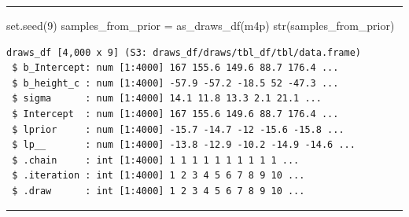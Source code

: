 \documentclass[
  letterpaper,
  DIV=11,
  numbers=noendperiod]{scrartcl}
\newenvironment{Shaded}{\begin{snugshade}}{\end{snugshade}}
\newcommand{\AttributeTok}[1]{\textcolor[rgb]{0.40,0.45,0.13}{#1}}
\newcommand{\DecValTok}[1]{\textcolor[rgb]{0.68,0.00,0.00}{#1}}
\newcommand{\FunctionTok}[1]{\textcolor[rgb]{0.28,0.35,0.67}{#1}}
\newcommand{\NormalTok}[1]{\textcolor[rgb]{0.00,0.23,0.31}{#1}}
\newcommand{\OtherTok}[1]{\textcolor[rgb]{0.00,0.23,0.31}{#1}}
\newcommand{\SpecialCharTok}[1]{\textcolor[rgb]{0.37,0.37,0.37}{#1}}
\newcommand{\StringTok}[1]{\textcolor[rgb]{0.13,0.47,0.30}{#1}}
\begin{document}
\begin{center}\rule{0.5\linewidth}{0.5pt}\end{center}

\begin{Shaded}
\begin{Highlighting}[]
\FunctionTok{set.seed}\NormalTok{(}\DecValTok{9}\NormalTok{)}
\NormalTok{samples\_from\_prior }\OtherTok{=} \FunctionTok{as\_draws\_df}\NormalTok{(m4p)}
\FunctionTok{str}\NormalTok{(samples\_from\_prior)}
\end{Highlighting}
\end{Shaded}

\begin{verbatim}
draws_df [4,000 x 9] (S3: draws_df/draws/tbl_df/tbl/data.frame)
 $ b_Intercept: num [1:4000] 167 155.6 149.6 88.7 176.4 ...
 $ b_height_c : num [1:4000] -57.9 -57.2 -18.5 52 -47.3 ...
 $ sigma      : num [1:4000] 14.1 11.8 13.3 2.1 21.1 ...
 $ Intercept  : num [1:4000] 167 155.6 149.6 88.7 176.4 ...
 $ lprior     : num [1:4000] -15.7 -14.7 -12 -15.6 -15.8 ...
 $ lp__       : num [1:4000] -13.8 -12.9 -10.2 -14.9 -14.6 ...
 $ .chain     : int [1:4000] 1 1 1 1 1 1 1 1 1 1 ...
 $ .iteration : int [1:4000] 1 2 3 4 5 6 7 8 9 10 ...
 $ .draw      : int [1:4000] 1 2 3 4 5 6 7 8 9 10 ...
\end{verbatim}

\begin{center}\rule{0.5\linewidth}{0.5pt}\end{center}

\begin{Shaded}
\end{Shaded}
\end{document}

